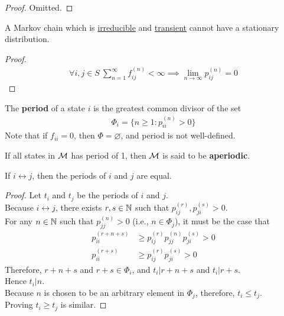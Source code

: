 \documentclass{article}
\newcommand{\upn}[0]{^{(n)}}
\begin{document}
	\begin{proof}
		Omitted.
	\end{proof}
	
	\begin{corollary}
		A Markov chain which is \ul{irreducible} and \ul{transient} cannot have a stationary distribution.
	\end{corollary}
	
	\begin{proof}
		\begin{align}
			\forall i, j \in S\ \sum_{n=1}^\infty f_{ij}\upn < \infty \implies \lim_{n\to\infty}p_{ij}\upn = 0
		\end{align}
	\end{proof}
	
	\begin{definition}
		The \textbf{period} of a state $i$ is the greatest common divisor of the set
		\begin{align}
			\Phi_i = \{n \geq 1: p_{ii}\upn > 0\}
		\end{align}
		Note that if $f_{ii} = 0$, then $\Phi = \varnothing$, and period is not well-defined.
	\end{definition}
	
	\begin{definition}
		If all states in $\mathcal{{M}}$ has period of 1, then $\mathcal{{M}}$ is said to be \textbf{aperiodic}.
	\end{definition}
	
	\begin{lemma}
		If $i \leftrightarrow j$, then the periods of $i$ and $j$ are equal.
	\end{lemma}
	
	\begin{proof}
		Let $t_i$ and $t_j$ be the periods of $i$ and $j$. \\
		Because $i \leftrightarrow j$, there exists $r, s \in \mathbb{N}$ such that $p_{ij}^{(r)}, p_{ji}^{(s)} > 0$. \\
		For any $n \in \mathbb{N}$ such that $p_{jj}\upn > 0$ (i.e., $n \in \Phi_j$), it must be the case that
		\begin{align}
			p^{(r+n+s)}_{ii} &\geq p_{ij}^{(r)} p_{jj}\upn p_{ji}^{(s)} > 0 \\
			p^{(r+s)}_{ii} &\geq p_{ij}^{(r)} p_{ji}^{(s)} > 0
		\end{align}
		Therefore, $r+n+s$ and $r + s \in \Phi_i$, and $t_i | r + n + s$ and $t_i | r + s$. \\
		Hence $t_i | n$. \\
		Because $n$ is chosen to be an arbitrary element in $\Phi_j$, therefore, $t_i \leq t_j$. \\
		Proving $t_i \geq t_j$ is similar. 
	\end{proof}
	
\end{document}
